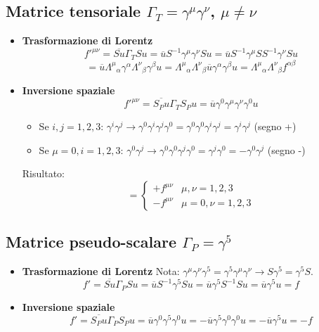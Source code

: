 \subsection{Matrice tensoriale $\Gamma_T = \gamma^\mu \gamma^\nu$, $\mu \neq \nu$}
\begin{itemize}
	\item \textbf{Trasformazione di Lorentz}
	\[
	f'^{\mu\nu} = \overline{S u} \Gamma_T S u = \overline{u} S^{-1} \gamma^\mu \gamma^\nu S u = \overline{u} S^{-1} \gamma^\mu S S^{-1} \gamma^\nu S u 
	\]
	\[
	= \overline{u} {\Lambda^\mu}_\alpha \gamma^\alpha {\Lambda^\nu}_\beta \gamma^\beta u = {\Lambda^\mu}_\alpha {\Lambda^\nu}_\beta \overline{u} \gamma^\alpha \gamma^\beta u = {\Lambda^\mu}_\alpha {\Lambda^\nu}_\beta f^{\alpha\beta}
	\]
	\item \textbf{Inversione spaziale}
	\[
	f'^{\mu\nu} = \overline{S_P u} \Gamma_T S_P u = \overline{u} \gamma^0 \gamma^\mu \gamma^\nu \gamma^0 u
	\]
	\begin{itemize}
		\item Se $i,j = 1,2,3$: $\gamma^i \gamma^j \rightarrow \gamma^0 \gamma^i \gamma^j \gamma^0 = \gamma^0 \gamma^0 \gamma^i \gamma^j = \gamma^i \gamma^j$ (segno +)
		\item Se $\mu=0, i=1,2,3$: $\gamma^0 \gamma^j \rightarrow \gamma^0 \gamma^0 \gamma^j \gamma^0 = \gamma^j \gamma^0 = -\gamma^0 \gamma^j$ (segno -)
	\end{itemize}
	Risultato:
	\[
	= \begin{cases} 
		+ f^{\mu\nu} & \mu,\nu = 1,2,3 \\ 
		- f^{\mu\nu} & \mu=0, \nu=1,2,3 
	\end{cases}
	\]
\end{itemize}
\subsection{Matrice pseudo-scalare $\Gamma_P = \gamma^5$}
\begin{itemize}
	\item \textbf{Trasformazione di Lorentz}
	Nota: $\gamma^\mu \gamma^\nu \gamma^5 = \gamma^5 \gamma^\mu \gamma^\nu \rightarrow S \gamma^5 = \gamma^5 S$.
	\[
	f' = \overline{S u} \Gamma_P S u = \overline{u} S^{-1} \gamma^5 S u = \overline{u} \gamma^5 S^{-1} S u = \overline{u} \gamma^5 u = f
	\]
	\item \textbf{Inversione spaziale}
	\[
	f' = \overline{S_P u} \Gamma_P S_P u = \overline{u} \gamma^0 \gamma^5 \gamma^0 u = - \overline{u} \gamma^5 \gamma^0 \gamma^0 u = - \overline{u} \gamma^5 u = -f
	\]
\end{itemize}
